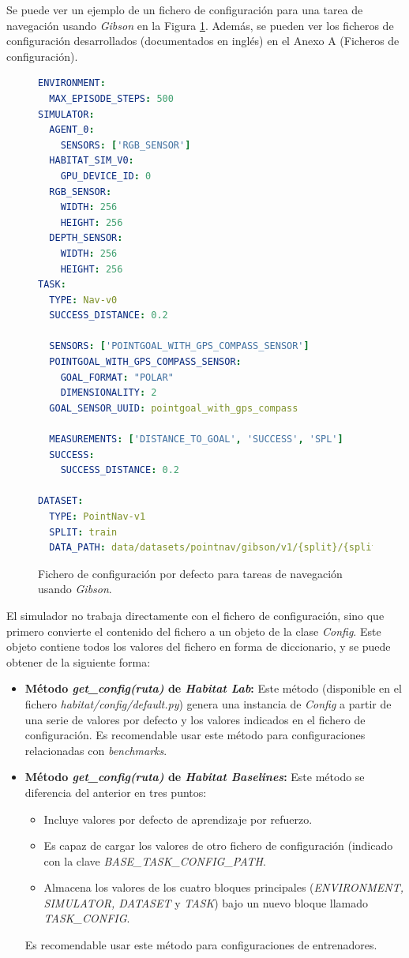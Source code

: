Se puede ver un ejemplo de un fichero de configuración para una tarea de navegación usando \textit{Gibson} en la Figura \ref{fig:chap4-conf}. Además, se pueden ver los ficheros de configuración desarrollados (documentados en inglés) en el Anexo A (Ficheros de configuración).

\begin{figure}[!ht]
\centering
\begin{lstlisting}[language=yaml]
ENVIRONMENT:
  MAX_EPISODE_STEPS: 500
SIMULATOR:
  AGENT_0:
    SENSORS: ['RGB_SENSOR']
  HABITAT_SIM_V0:
    GPU_DEVICE_ID: 0
  RGB_SENSOR:
    WIDTH: 256
    HEIGHT: 256
  DEPTH_SENSOR:
    WIDTH: 256
    HEIGHT: 256
TASK:
  TYPE: Nav-v0
  SUCCESS_DISTANCE: 0.2

  SENSORS: ['POINTGOAL_WITH_GPS_COMPASS_SENSOR']
  POINTGOAL_WITH_GPS_COMPASS_SENSOR:
    GOAL_FORMAT: "POLAR"
    DIMENSIONALITY: 2
  GOAL_SENSOR_UUID: pointgoal_with_gps_compass

  MEASUREMENTS: ['DISTANCE_TO_GOAL', 'SUCCESS', 'SPL']
  SUCCESS:
    SUCCESS_DISTANCE: 0.2

DATASET:
  TYPE: PointNav-v1
  SPLIT: train
  DATA_PATH: data/datasets/pointnav/gibson/v1/{split}/{split}.json.gz
\end{lstlisting}
\caption{Fichero de configuración por defecto para tareas de navegación usando \textit{Gibson}.}
\label{fig:chap4-conf}
\end{figure}

El simulador no trabaja directamente con el fichero de configuración, sino que primero convierte el contenido del fichero a un objeto de la clase \textit{Config}. Este objeto contiene todos los valores del fichero en forma de diccionario, y se puede obtener de la siguiente forma:

\begin{itemize}
	\item \textbf{Método \textit{get{\_}config(ruta)} de \textit{Habitat Lab}:} Este método (disponible en el fichero \textit{habitat/config/default.py}) genera una instancia de \textit{Config} a partir de una serie de valores por defecto y los valores indicados en el fichero de configuración. Es recomendable usar este método para configuraciones relacionadas con \textit{benchmarks}.
	\item \textbf{Método \textit{get{\_}config(ruta)} de \textit{Habitat Baselines}:} Este método se diferencia del anterior en tres puntos:
	\begin{itemize}
		\item Incluye valores por defecto de aprendizaje por refuerzo.
		\item Es capaz de cargar los valores de otro fichero de configuración (indicado con la clave \textit{BASE{\_}TASK{\_}CONFIG{\_}PATH}.
		\item Almacena los valores de los cuatro bloques principales (\textit{ENVIRONMENT, SIMULATOR, DATASET} y \textit{TASK}) bajo un nuevo bloque llamado \textit{TASK{\_}CONFIG}.
	\end{itemize}	 
	Es recomendable usar este método para configuraciones de entrenadores.
\end{itemize}

